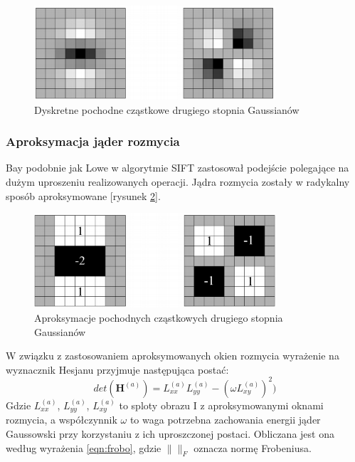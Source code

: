 \begin{figure}[!htb]
\centering
\includegraphics[width=0.8\textwidth]{pict/02/surf/surf_bay_gaussian_discretization.png}
\caption{Dyskretne pochodne cząstkowe drugiego stopnia Gaussianów}
\label{fig:surf_bay_gaussian_discretization}
\end{figure}
\subsubsection{Aproksymacja jąder rozmycia}
Bay podobnie jak Lowe w algorytmie SIFT zastosował podejście polegające na dużym uproszeniu realizowanych operacji. Jądra rozmycia zostały w radykalny sposób aproksymowane [rysunek \ref{fig:surf_bay_gaussian_approximation}].

\begin{figure}[!htb]
\centering
\includegraphics[width=0.8\textwidth]{pict/02/surf/surf_bay_gaussian_approximation.png}
\caption{Aproksymacje pochodnych cząstkowych drugiego stopnia Gaussianów}
\label{fig:surf_bay_gaussian_approximation}
\end{figure}

W związku z zastosowaniem aproksymowanych okien rozmycia wyrażenie na wyznacznik Hesjanu przyjmuje następująca postać:
\begin{equation}
det(\textbf{H}^{(a)}) = L_{xx}^{(a)} L_{yy}^{(a)}-(\omega L_{xy}^{(a)})^2)
\label{eqn:det_aprox}
\end{equation}
Gdzie $L_{xx}^{(a)}$, $L_{yy}^{(a)}$, $L_{xy}^{(a)}$ to sploty obrazu I z aproksymowanymi oknami rozmycia, a współczynnik $\omega$ to waga potrzebna zachowania energii jąder Gaussowski przy korzystaniu z ich uproszczonej postaci. Obliczana jest ona według wyrażenia \ref{eqn:frobo}, gdzie $\|\|_F$ oznacza normę Frobeniusa.


